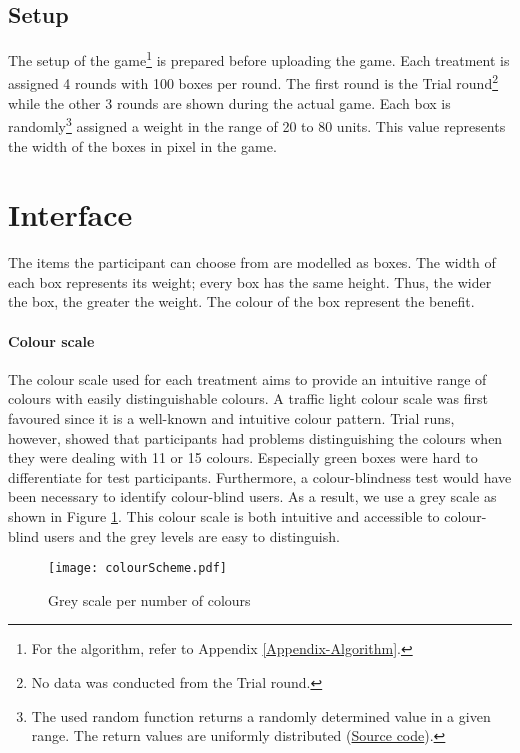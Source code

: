 \subsection{Setup}
\label{ch:Experiment:sec:Setup}

The setup of the game\footnote{For the algorithm, refer to Appendix \ref{Appendix-Algorithm}.} is prepared before uploading the game. 
Each treatment is assigned 4 rounds with 100 boxes per round. The first round is the Trial round\footnote{No data was conducted from the Trial round.} while the other 3 rounds are shown during the actual game.
Each box is randomly\footnote{The used random function returns a randomly determined value in a given range. The return values are uniformly distributed (\href{http://hg.python.org/cpython/file/2.7/Lib/random.py}{Source code}).} assigned a weight in the range of 20 to 80 units. This value represents the width of the boxes in pixel in the game.



\section{Interface}
\label{ch:Experiment:sec:Interface}
The items the participant can choose from are modelled as boxes. The width of each box represents its weight; every box has the same height. Thus, the wider the box, the greater the weight. 
The colour of the box represent the benefit.

\paragraph{Colour scale}
The colour scale used for each treatment aims to provide an intuitive range of colours with easily distinguishable colours. A traffic light colour scale was first favoured  since it is a well-known and intuitive colour pattern. Trial runs, however, showed that participants had problems distinguishing the colours when they were dealing with 11 or 15 colours. Especially green boxes were hard to differentiate for test participants. Furthermore, a colour-blindness test would have been necessary to identify colour-blind users.
As a result, we use a grey scale as shown in Figure \ref{fig:colourScheme}. This colour scale is both intuitive and accessible to colour-blind users and the grey levels are easy to distinguish.\\
\begin{figure}[htp] %
\begin{center}
  \texttt{[image: colourScheme.pdf]}
\caption{Grey scale per number of colours}
\label{fig:colourScheme}
\end{center}
\end{figure} 

